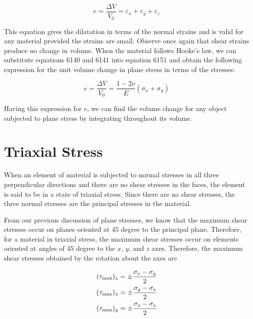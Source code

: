 \documentclass[
10pt,
a4paper,
openany,
svgnames,
]{kaobook} %
\begin{document}
\begin{equation} \label{eqn: 2d dilatation}
  e = \frac{\Delta V}{V_0} = \varepsilon_x + \varepsilon_y + \varepsilon_z
\end{equation}

This equation gives the dilatation in terms of the normal strains and is valid for any material provided the strains are small. Observe once again that shear strains produce no change in volume. When the material follows Hooke’s law, we can substitute equations 6140 and 6141 into equation 6151 and obtain the following expression for the unit volume change in plane stress in terms of the stresses:

\begin{equation}
  e = \frac{\Delta V}{V_0} = \frac{1 - 2\nu}{E}(\sigma_x + \sigma_y)
\end{equation}
  
Having this expression for $e$, we can find the volume change for any object subjected to plane stress by integrating throughout its volume.

\section{Triaxial Stress}

When an element of material is subjected to normal stresses in all three perpendicular directions and there are no shear stresses in the faces, the element is said to be in a state of triaxial stress. Since there are no shear stresses, the three normal stresses are the principal stresses in the material.

From our previous discussion of plane stresses, we know that the maximum shear stresses occur on planes oriented at 45 degree to the principal plane. Therefore, for a material in triaxial stress, the maximum shear stresses occur on elements oriented at angles of 45 degree to the $x$, $y$, and $z$ axes. Therefore, the maximum shear stresses obtained by the rotation about the axes are

\begin{equation}
  \begin{gathered}
    (\tau_{\max })_z =  \pm \frac{\sigma_x - \sigma_y}{2} \hfill \\
    (\tau_{\max })_x =  \pm \frac{\sigma_y - \sigma_z}{2} \hfill \\
    (\tau_{\max })_y =  \pm \frac{\sigma_x - \sigma_z}{2} \hfill \\ 
  \end{gathered}
\end{equation}
\end{document}
